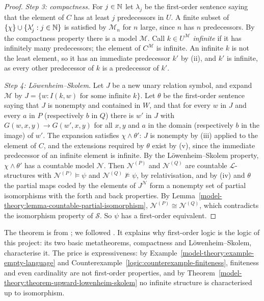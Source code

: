 \begin{proof}
\emph{Step 3: compactness.} For $j \in \mathbb{N}$ let $\lambda_j$ be the first-order sentence saying that the element of $C$ has at least $j$ predecessors in $U$. A
finite subset of $\{\chi\} \cup \{\lambda_j' : j \in \mathbb{N}\}$ is satisfied by $\mathcal{M}_n$ for $n$ large, since $n$ has $n$ predecessors. By the compactness
property there is a model $\mathcal{M}$. Call $k \in U^{\mathcal{M}}$ \emph{infinite} if it has infinitely many predecessors; the element of $C^{\mathcal{M}}$ is
infinite. An infinite $k$ is not the least element, so it has an immediate predecessor $k'$ by (ii), and $k'$ is infinite, as every other predecessor of $k$ is a
predecessor of $k'$.

\emph{Step 4: L\"owenheim--Skolem.} Let $J$ be a new unary relation symbol, and expand $\mathcal{M}$ by
$J = \{w : I(k, w) \text{ for some infinite } k\}$. Let $\theta$ be the first-order sentence saying that $J$ is nonempty and contained in $W$, and that for every
$w$ in $J$ and every $a$ in $P$ (respectively $b$ in $Q$) there is $w'$ in $J$ with $G(w, x, y) \to G(w', x, y)$ for all $x, y$ and $a$ in the domain (respectively
$b$ in the image) of $w'$. The expansion satisfies $\chi \wedge \theta'$: $J$ is nonempty by (iii) applied to the element of $C$, and the extensions required
by $\theta$ exist by (v), since the immediate predecessor of an infinite element is infinite. By the L\"owenheim--Skolem property, $\chi \wedge \theta'$ has a
countable model $\mathcal{N}$. Then $\mathcal{N}^{(P)}$ and $\mathcal{N}^{(Q)}$ are countable $\mathcal{L}$-structures with $\mathcal{N}^{(P)} \models \psi$ and
$\mathcal{N}^{(Q)} \not\models \psi$, by relativisation, and by (iv) and $\theta$ the partial maps coded by the elements of $J^{\mathcal{N}}$ form a nonempty set
of partial isomorphisms with the forth and back properties. By Lemma~\ref{model-theory:lemma-countable-partial-isomorphism},
$\mathcal{N}^{(P)} \cong \mathcal{N}^{(Q)}$, which contradicts the isomorphism property of $\mathcal{S}$. So $\psi$ has a first-order equivalent.
\end{proof}

\begin{remark}\label{model-theory:remark-lindstrom}
The theorem is from \cite{lindstrom-1969}; we followed \cite[Chapter XIII]{ebbinghaus-flum-thomas}. It explains why first-order logic is the logic of this
project: its two basic metatheorems, compactness and L\"owenheim--Skolem, characterise it. The price is expressiveness: by
Example~\ref{model-theory:example-empty-language} and Counterexample~\ref{logic:counterexample-finiteness}, finiteness and even cardinality are not first-order
properties, and by Theorem~\ref{model-theory:theorem-upward-lowenheim-skolem} no infinite structure is characterised up to isomorphism.
\end{remark}


